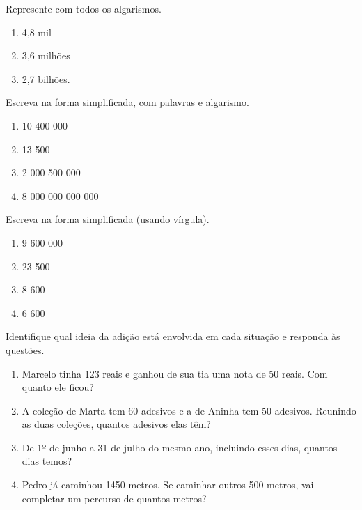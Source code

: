 		\item Represente com todos os algarismos.
		\begin{multicols}{3}		
		\begin{enumerate}
			\item 4,8 mil
			\item 3,6 milhões
			\item 2,7 bilhões.
		\end{enumerate}
		\end{multicols}
		
		\item Escreva na forma simplificada, com palavras e algarismo.
		\begin{multicols}{2}		
		\begin{enumerate}
			\item 10 400 000
			\item 13 500
			\item 2 000 500 000
			\item 8 000 000 000 000 
		\end{enumerate}
		\end{multicols}
		
		\item Escreva na forma simplificada (usando vírgula).
		\begin{multicols}{4}		
		\begin{enumerate}
			\item 9 600 000
			\item 23 500
			\item 8 600
			\item 6 600
		\end{enumerate}
		\end{multicols}
		
		\item Identifique qual ideia da adição está envolvida em cada situação e responda às questões.
		\begin{enumerate}
			\item Marcelo tinha 123 reais e ganhou de sua tia uma nota de 50 reais. Com quanto ele ficou?
			\item A coleção de Marta tem 60 adesivos e a de Aninha tem 50 adesivos. Reunindo as duas coleções, quantos adesivos elas têm?
			\item De 1º de junho a 31 de julho do mesmo ano, incluindo esses dias, quantos dias temos?
			\item Pedro já caminhou 1450 metros. Se caminhar outros 500 metros, vai completar um percurso de quantos metros?
		\end{enumerate}
		
